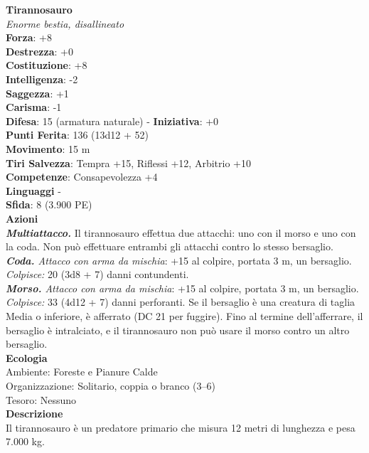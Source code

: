 \begin{multicols}{2}
\medskip\textbf{Tirannosauro}\\
\emph{Enorme bestia, disallineato}\\
\textbf{Forza}: +8\\
\textbf{Destrezza}: +0\\
\textbf{Costituzione}: +8\\
\textbf{Intelligenza}: -2\\
\textbf{Saggezza}: +1\\
\textbf{Carisma}: -1\\
\textbf{Difesa}: 15 (armatura naturale) - \textbf{Iniziativa}: +0\\
\textbf{Punti Ferita}: 136 (13d12 + 52)\\
\textbf{Movimento}: 15 m\\
\textbf{Tiri Salvezza}: Tempra +15, Riflessi +12, Arbitrio +10\\
\textbf{Competenze}: Consapevolezza +4\\
\textbf{Linguaggi} -\\
\textbf{Sfida}: 8 (3.900 PE)\smallskip\\
\smallskip\textbf{Azioni}\\
\emph{\textbf{Multiattacco.}} Il tirannosauro effettua due attacchi: uno con il morso e uno con la coda. Non può effettuare entrambi gli attacchi contro lo stesso bersaglio. \\
\emph{\textbf{Coda.} Attacco con arma da mischia}: +15 al colpire, portata 3 m, un bersaglio.\\
\emph{Colpisce:} 20 (3d8 + 7) danni contundenti.\\
\emph{\textbf{Morso.} Attacco con arma da mischia}: +15 al colpire, portata 3 m, un bersaglio.\\
\emph{Colpisce:} 33 (4d12 + 7) danni perforanti. Se il bersaglio è una creatura di taglia Media o inferiore, è afferrato (DC  21 per fuggire). Fino al termine dell'afferrare, il bersaglio è intralciato, e il tirannosauro non può usare il morso contro un altro bersaglio.\\
\textbf{Ecologia}\\
Ambiente: Foreste e Pianure Calde\\
Organizzazione: Solitario, coppia o branco (3–6)\\
Tesoro: Nessuno\\
\textbf{Descrizione}\\
Il tirannosauro è un predatore primario che misura 12 metri di lunghezza e pesa 7.000 kg.\\


\end{multicols}
